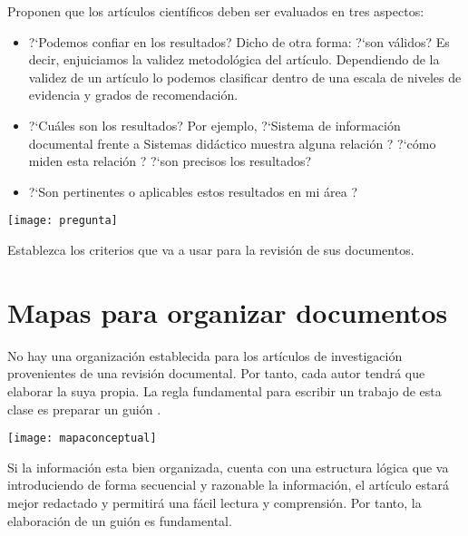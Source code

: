 Proponen que los artículos científicos deben ser evaluados en tres aspectos: 


\begin{itemize}
	\item ?`Podemos confiar en los resultados? Dicho de otra forma:  ?`son válidos? Es decir,   enjuiciamos la validez metodológica del artículo.  Dependiendo de la validez de un artículo lo podemos clasificar dentro de una escala de niveles de evidencia y grados de recomendación. 

 	\item   ?`Cuáles son los resultados? Por ejemplo, ?`Sistema de información documental frente a Sistemas didáctico muestra alguna relación ?  ?`cómo miden esta relación ? ?`son precisos los resultados?

	\item ?`Son pertinentes o aplicables estos resultados en mi área ?
\end{itemize}


\begin{marginfigure}[1.2cm]%
	\texttt{[image: pregunta]}
\end{marginfigure}

\begin{kaobox}[frametitle=Ejercicio]
	Establezca los criterios que va a usar para la revisi\'on de sus documentos. %
\end{kaobox}


\section{Mapas para organizar documentos}

 No hay una organización establecida para los art\'iculos de investigaci\'on provenientes de una revisión documental. Por tanto, cada autor tendrá que elaborar la suya propia. La
regla fundamental para escribir un trabajo de esta clase es preparar un guión \cite{GuiraoGoris2008}.


\begin{marginfigure}[1cm]%
	\texttt{[image: mapaconceptual]}
\end{marginfigure}
 Si la información esta bien organizada, cuenta con una estructura lógica que va introduciendo de forma secuencial y razonable la información, el artículo estará mejor redactado y permitirá una fácil lectura y comprensión. Por tanto, la elaboración de un guión es fundamental.
 
